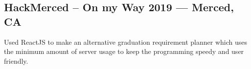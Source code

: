 \documentclass[../Resume.tex]{subfiles}
\begin{document}
	\subsection{HackMerced -- On my Way \null\hfill 2019 --- Merced, CA}
	\par Used ReactJS to make an alternative graduation requirement planner which uses the minimum amount of server usage to keep the programming speedy and user friendly.
	\vspace*{-2mm}
\end{document}
